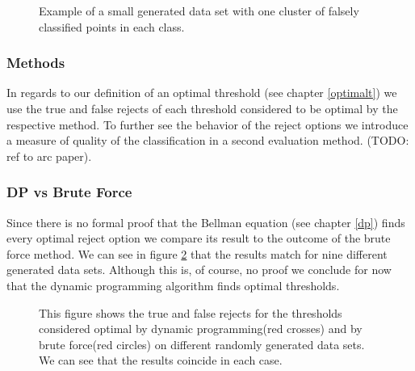 \begin{figure}[!htbp]
\centering
\caption{Example of a small generated data set with one cluster of falsely classified points in each class.}
\label{dataset}
\end{figure}

\subsubsection{Methods}
In regards to our definition of an optimal threshold (see chapter \ref{optimalt}) we use the true and false rejects of each threshold considered to be optimal by the respective method. To further see the behavior of the reject options we introduce a measure of quality of the classification in a second evaluation method. (TODO: ref to arc paper).


\subsubsection{DP vs Brute Force}
Since there is no formal proof that the Bellman equation (see chapter \ref{dp}) finds every optimal reject option we compare its result to the outcome of the brute force method. We can see in figure \ref{dpEvaPareto} that the results match for nine different generated data sets. Although this is, of course, no proof we conclude for now that the dynamic programming algorithm finds optimal thresholds.

\begin{figure}[!htbp]
\centering
\caption{This figure shows the true and false rejects for the thresholds considered optimal by dynamic programming(red crosses) and by brute force(red circles) on different randomly generated data sets. We can see that the results coincide in each case. }
\label{dpEvaPareto}
\end{figure}

